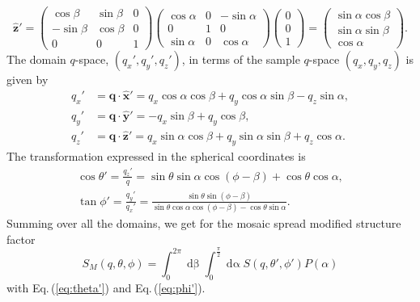 \begin{equation}
  \mathbf{\hat{z}}' = 
  \begin{pmatrix} 
    \cos\beta & \sin\beta & 0 \\ 
    -\sin\beta & \cos\beta & 0 \\
    0 & 0 & 1 
  \end{pmatrix}
  \begin{pmatrix} 
    \cos\alpha & 0 & -\sin\alpha \\ 
    0 & 1 & 0 \\
    \sin\alpha & 0 & \cos\alpha 
  \end{pmatrix}
  \begin{pmatrix}
    0 \\
    0 \\
    1
  \end{pmatrix}
  =
  \begin{pmatrix}
    \sin\alpha\cos\beta \\
    \sin\alpha\sin\beta \\
    \cos\alpha
  \end{pmatrix}.
\end{equation}
The domain $q$-space, $(q_x',q_y',q_z')$, in terms of the sample $q$-space 
$(q_x,q_y,q_z)$ is given by
\begin{align}
  q_x' &= \mathbf{q} \cdot \mathbf{\hat{x}'} 
  = q_x\cos\alpha\cos\beta + q_y\cos\alpha\sin\beta -q_z\sin\alpha, 
  \label{eq:qx'} \\
  q_y' &= \mathbf{q} \cdot \mathbf{\hat{y}'} 
  = -q_x\sin\beta + q_y\cos\beta, 
  \label{eq:qy'} \\
  q_z' &= \mathbf{q} \cdot \mathbf{\hat{z}'} 
  = q_x\sin\alpha\cos\beta + q_y\sin\alpha\sin\beta + q_z\cos\alpha.
  \label{eq:qz'}
\end{align}
The transformation expressed in the spherical coordinates is 
\begin{align}
  \cos\theta' = \frac{q_z'}{q} 
              = \sin\theta\sin\alpha\cos(\phi-\beta) + \cos\theta\cos\alpha, 
               \label{eq:theta'}\\
  \tan\phi' 
    = \frac{q_y'}{q_x'}
    = \frac{\sin\theta\sin(\phi-\beta)}{\sin\theta\cos\alpha\cos(\phi-\beta) 
                                       -\cos\theta\sin\alpha}.
  \label{eq:phi'}
\end{align}
Summing over all the domains, we get 
for the mosaic spread modified structure factor
\begin{equation}
  S_M(q,\theta,\phi) = \int_0^{2\pi}\mathop{d\beta} \int_0^{\frac{\pi}{2}} 
  \mathop{d\alpha} S(q,\theta',\phi')P(\alpha)
  \label{eq:SM}
\end{equation}
with Eq.\,(\ref{eq:theta'}) and Eq.\,(\ref{eq:phi'}).

